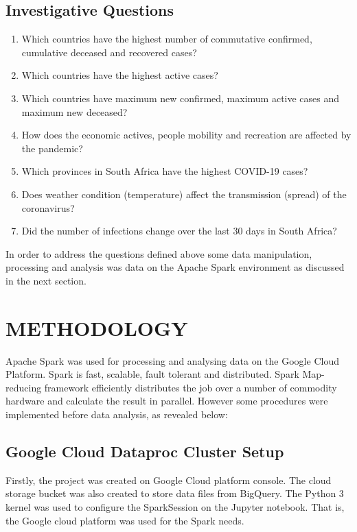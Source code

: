 \documentclass[12pt]{article}
\begin{document}
\subsection{Investigative Questions}

\begin{enumerate}
    \item Which  countries have the highest number of commutative confirmed, cumulative deceased and recovered cases?
    \item  Which countries have the highest active cases?
    \item Which countries have maximum new confirmed, maximum active cases and maximum new deceased?
    \item How does the economic actives, people mobility and recreation are affected by the pandemic?
    \item Which provinces in South Africa have the  highest COVID-19 cases?
    \item Does weather condition (temperature) affect the transmission (spread) of the coronavirus?
    \item Did the number of infections change over the last 30 days in  South Africa?
\end{enumerate}

In order to address the questions  defined above  some  data manipulation, processing and analysis was data on the  Apache Spark environment as discussed in the next section.

\section{METHODOLOGY}
Apache Spark was used for processing and analysing data on the Google Cloud Platform. Spark is fast, scalable, fault tolerant and distributed. Spark Map-reducing framework efficiently distributes the job over a number of commodity hardware and calculate the result in parallel. However some procedures were implemented before data analysis, as revealed below:

\subsection{ Google Cloud Dataproc Cluster Setup}
Firstly, the project was created on Google Cloud platform console. The cloud storage bucket was also created to store data files from BigQuery. The Python 3 kernel was used to configure the SparkSession on the Jupyter notebook.  That is, the Google cloud platform was used for the Spark needs.
\end{document}
